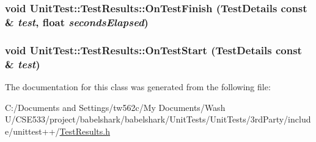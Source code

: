 \hypertarget{class_unit_test_1_1_test_results_0b35af87ce16d6064bc3cef5b6d85d0f}{
\subsubsection[{OnTestFinish}]{\setlength{\rightskip}{0pt plus 5cm}void UnitTest::TestResults::OnTestFinish ({\bf TestDetails} const \& {\em test}, \/  float {\em secondsElapsed})}}
\label{class_unit_test_1_1_test_results_0b35af87ce16d6064bc3cef5b6d85d0f}


\hypertarget{class_unit_test_1_1_test_results_d37dd4b529bbdcd83f6c48e9140a6007}{
\subsubsection[{OnTestStart}]{\setlength{\rightskip}{0pt plus 5cm}void UnitTest::TestResults::OnTestStart ({\bf TestDetails} const \& {\em test})}}
\label{class_unit_test_1_1_test_results_d37dd4b529bbdcd83f6c48e9140a6007}




The documentation for this class was generated from the following file:\begin{CompactItemize}
\item 
C:/Documents and Settings/tw562c/My Documents/Wash U/CSE533/project/babelshark/babelshark/UnitTests/UnitTests/3rdParty/include/unittest++/\hyperlink{_test_results_8h}{TestResults.h}\end{CompactItemize}
